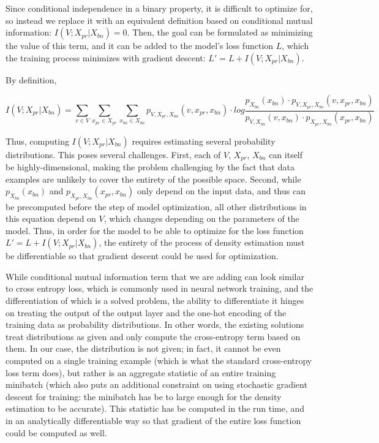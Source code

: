 Since conditional independence in a binary property, it is difficult to optimize
for, so instead we replace it with an equivalent definition based on conditional
mutual information: $I(V;X_{pr}|X_{bn}) = 0$. Then, the goal can be formulated
as minimizing the value of this term, and it can be added to the model’s loss
function $L$, which the training process minimizes with gradient descent:
$L' = L + I(V;X_{pr}|X_{bn})$.

By definition,

\begin{equation}
I(V;X_{pr}|X_{bn}) = \sum_{v \in V} \sum_{x_{pr} \in X_{pr}}
\sum_{x_{bn} \in X_{bn}} p_{V,X_{pr},X_{bn}}(v,x_{pr},x_{bn}) \cdot log
\frac{p_{X_{bn}}(x_{bn})\cdot p_{V,X_{pr},X_{bn}}(v,x_{pr},x_{bn})}
{p_{V,X_{bn}}(v,x_{bn}) \cdot p_{X_{pr},X_{bn}}(x_{pr},x_{bn})}
\end{equation}

Thus, computing $I(V;X_{pr}|X_{bn})$ requires estimating several probability
distributions. This poses several challenges. First, each of $V$, $X_{pr}$,
$X_{bn}$ can itself be highly-dimensional, making the problem challenging by
the fact that data examples are unlikely to cover the entirety of the possible
space. Second, while $p_{X_{bn}}(x_{bn})$ and $p_{X_{pr},X_{bn}}(x_{pr},x_{bn})$
only depend on the input data, and thus can be precomputed before the step of
model optimization, all other distributions in this equation depend on $V$,
which changes depending on the parameters of the model. Thus, in order for the
model to be able to optimize for the loss function $L' = L + I(V;X_{pr}|X_{bn})$,
the entirety of the process of density estimation must be differentiable so that
gradient descent could be used for optimization.

While conditional mutual information term that we are adding can look similar to
cross entropy loss, which is commonly used in neural network training, and the
differentiation of which is a solved problem, the ability to differentiate it
hinges on treating the output of the output layer and the one-hot encoding of
the training data as probability distributions. In other words, the existing
solutions treat distributions as given and only compute the cross-entropy term
based on them. In our case, the distribution is not given; in fact, it cannot be
even computed on a single training example (which is what the standard
cross-entropy loss term does), but rather is an aggregate statistic of an entire
training minibatch (which also puts an additional constraint on using stochastic
gradient descent for training: the minibatch has be to large enough for the
density estimation to be accurate). This statistic has be computed in the run time,
and in an analytically differentiable way so that gradient of the entire loss
function could be computed as well.

